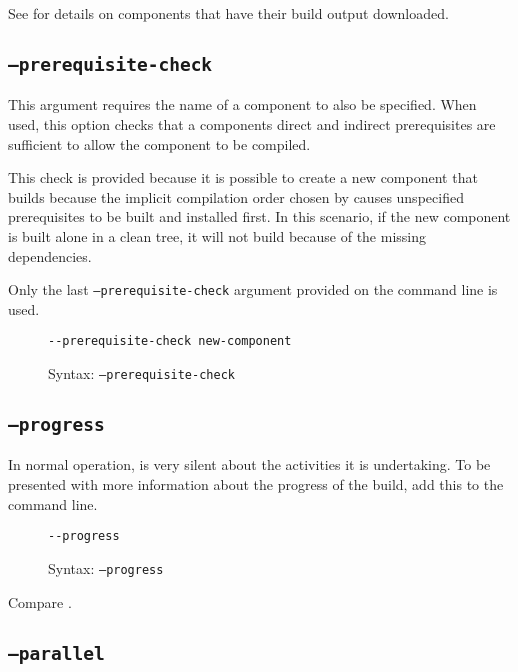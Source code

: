 See  for details on components
that have their build output downloaded.

\subsection{\texttt{--prerequisite-check}}\label{usinglmsbw:prerequisite-check}

This argument requires the name of a component to also be specified.
When used, this option checks that a components direct and indirect
prerequisites are sufficient to allow the component to be compiled.

This check is provided because it is possible to create a new
component that builds because the implicit compilation order chosen by
\make causes unspecified prerequisites to be built and installed
first.  In this scenario, if the new component is built alone in a
clean tree, it will not build because of the missing dependencies.

Only the last \texttt{--prerequisite-check} argument provided on the
command line is used.

\begin{figure}[h]
  \hrulefill
\begin{verbatim}
--prerequisite-check new-component
\end{verbatim}
  \caption{Syntax: \texttt{--prerequisite-check}}
  \hrulefill
\end{figure}

\subsection{\texttt{--progress}}\label{usinglmsbw:progress}

In normal operation, \lmsbw is very silent about the activities it is
undertaking.  To be presented with more information about the progress
of the build, add this to the command line.

\begin{figure}[h]
  \hrulefill
\begin{verbatim}
--progress
\end{verbatim}
  \caption{Syntax: \texttt{--progress}}
  \hrulefill
\end{figure}

Compare .

\subsection{\texttt{--parallel}}\label{usinglmsbw:parallel}

